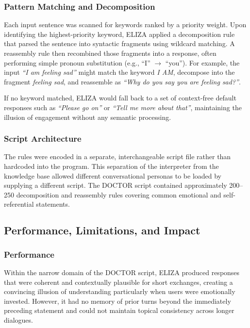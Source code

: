 \documentclass[11pt,a4paper]{report}
\begin{document}
\subsubsection{Pattern Matching and Decomposition}
Each input sentence was scanned for keywords ranked by a priority weight. Upon identifying the highest-priority
keyword, ELIZA applied a decomposition rule that parsed the sentence into syntactic fragments using wildcard
matching. A reassembly rule then recombined those fragments into a response, often performing simple pronoun
substitution (e.g., ``I'' $\to$ ``you''). For example, the input \textit{``I am feeling sad''} might match the
keyword \textit{I AM}, decompose into the fragment \textit{feeling sad}, and reassemble as \textit{``Why do you
say you are feeling sad?''}.

If no keyword matched, ELIZA would fall back to a set of context-free default responses such as
\textit{``Please go on''} or \textit{``Tell me more about that''}, maintaining the illusion of engagement without
any semantic processing.

\subsubsection{Script Architecture}
The rules were encoded in a separate, interchangeable script file rather than hardcoded into the program. This
separation of the interpreter from the knowledge base allowed different conversational personas to be loaded by
supplying a different script. The DOCTOR script contained approximately 200--250 decomposition and reassembly
rules covering common emotional and self-referential statements.

\subsection{Performance, Limitations, and Impact}

\subsubsection{Performance}
Within the narrow domain of the DOCTOR script, ELIZA produced responses that were coherent and contextually
plausible for short exchanges, creating a convincing illusion of understanding particularly when users were
emotionally invested. However, it had no memory of prior turns beyond the immediately preceding statement and
could not maintain topical consistency across longer dialogues.
\end{document}
